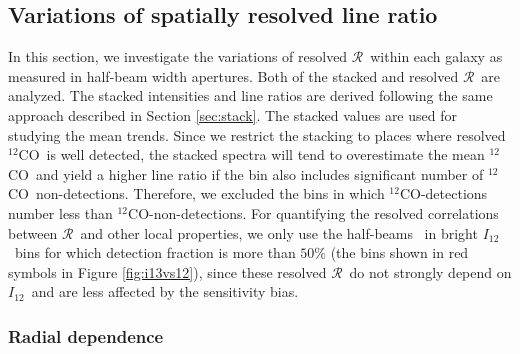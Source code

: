 \documentclass{emulateapj}
\def\twco{\mbox{$^{12}$CO}}
\def\rtt{$\mathcal{R}$}
\def\itw{$I_{12}$}
\begin{document}
\subsection{Variations of spatially resolved line ratio} \label{sec:spatial}

In this section, we investigate the variations of resolved \rtt \ 
within each galaxy as measured in half-beam width apertures. 
Both of the stacked and resolved \rtt \ are analyzed. 
The stacked intensities and line ratios are derived following the same approach described in Section \ref{sec:stack}.  
The stacked values are used for studying the mean trends.
Since we restrict the stacking to places where resolved \twco \ is well detected, 
the stacked spectra will tend to overestimate the mean \twco \ and yield a higher line ratio 
if the bin also includes significant number of \twco \ non-detections. Therefore, we 
excluded the bins in which \twco-detections number less than \twco-non-detections.
For quantifying the resolved correlations between \rtt \ and other local properties, we only use the half-beams \ in bright \itw \ bins for which detection fraction is more than $50\%$ (the bins shown in red symbols in Figure \ref{fig:i13vs12}), since these resolved \rtt \ do not strongly depend on \itw \ and are less affected by the sensitivity bias.
  

\subsubsection{Radial dependence}

\begin{figure*}[ht]
\caption{
Line intensity ratio \rtt \ as a function of radius. 
The first 11 panels show the results for each individual galaxy.
Small colored circles show the ratios for individual half-beams 
with \rtt \ detected, with the filled ones highlight those 
from which the correlation coefficients are derived. 
The gray scales show the distribution of 
\rtt$_{\rm min} = $\itw$/3\sigma_{13}$ for those with \twco \ detected 
but \rtt \ not detected.  
The black large circles are the stacked \rtt \ in each radius bin; 
the horizontal error bars reflect the bin size, and the vertical error bars 
show their uncertainties. 
The vertical dotted lines show the positions of $0.2 R_{25}$.
Spearman's rank correlation coefficient $r_s$ and 
the significance $P$ are shown in the top right of panels with $>$20 valid half-beams. 
The last panel is a summary plot showing stacked \rtt, 
with different colors representing different galaxies.
}
\label{fig:rradius}
\end{figure*}
\end{document}
